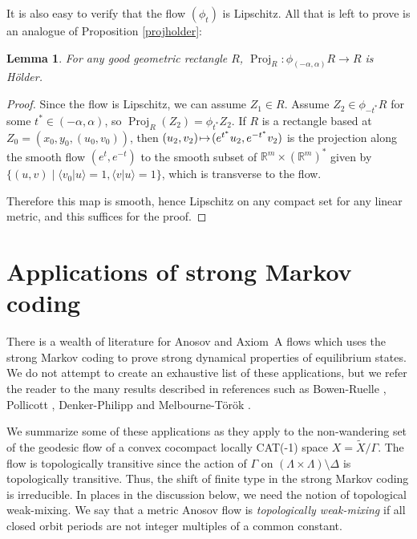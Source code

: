 \documentclass[JEP,XML,SOM,Unicode,NoFloatCountersInSection]{cedram}
\let\sep\mid
\def\mto{\mathchoice{\longmapsto}{\mapsto}{\mapsto}{\mapsto}}
\newtheorem{lem}[thm]{Lemma}
\theoremstyle{definition}
\numberwithin{equation}{section}
\DeclareMathOperator{\Proj}{Proj}
\begin{document}
It is also easy to verify that the flow $(\phi_t)$ is Lipschitz. All that is left to prove is an analogue of Proposition \ref{projholder}:

\begin{lem}
For any good geometric rectangle $R$, $\Proj_R:\phi_{(-\alpha,\alpha)} R \to R$ is Hölder.
\end{lem}

\begin{proof}
Since the flow is Lipschitz, we can assume $Z_1\!\in\! R$. Assume $Z_2 \!\in\! \phi_{-t^*}R$ for some $t^* \!\in\! (-\alpha, \alpha)$, so $\Proj_R(Z_2) \!=\! \phi_{t^*}Z_2$. If $R$ is a rectangle based at $Z_0\!=\!(x_0,y_0,(u_0,v_0))$, then $(u_2, v_2)\!\mto\! (e^{t^*}u_2, e^{-t^*}v_2)$ is the projection along the smooth flow $(e^t, e^{-t})$ to the smooth subset of $\mathbb{R}^m\!\times\! (\mathbb{R}^m)^*$ given by \hbox{$\{(u,v)\sep \langle v_0 | u \rangle \!=\!1, \langle v|u \rangle \!=\!1\}$}, which is transverse to the flow. \newpage

Therefore this map is smooth, hence Lipschitz on any compact set for any linear metric, and this suffices for the proof.
\end{proof}

\section{Applications of strong Markov coding}\label{s.applications}

There is a wealth of literature for Anosov and Axiom~A flows which uses the strong Markov coding to prove strong dynamical properties of equilibrium states. We do not attempt to create an exhaustive list of these applications, but we refer the reader to the many results described in references such as Bowen-Ruelle \cite{bowen-ruelle}, Pollicott \cite{pollicott}, Denker-Philipp \cite{DP84} and Melbourne-Török \cite{MT04}.

We summarize some of these applications as they apply to the non-wandering set of the geodesic flow of a convex cocompact locally CAT(-1) space $X = \tilde X/\Gamma$. The flow is topologically transitive since the action of $\Gamma$ on $(\Lambda \times \Lambda)\setminus \Delta$ is topologically transitive. Thus, the shift of finite type in the strong Markov coding is irreducible. In places in the discussion below, we need the notion of topological weak-mixing. We say that a metric Anosov flow is \emph{topologically weak-mixing} if all closed orbit periods are not integer multiples of a common constant.
\end{document}

